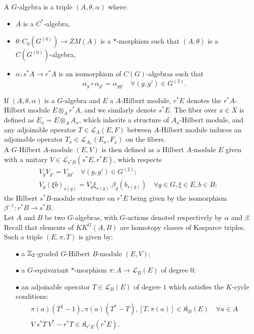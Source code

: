 A $G$-algebra is a triple $(A,\theta,\alpha) $ where:
\begin{itemize}
\item $A$ is a $C^*$-algebra, 
\item $\theta : C_0(G^{(0)})\rightarrow Z M(A)$ is a $*$-morphism such that $(A,\theta)$ is a $C(G^{(0)})$-algebra,  
\item $\alpha : s^*A \rightarrow r^* A$ is an isomorphism of $C(G)$-algebras such that 
\[ \alpha_{g}\circ \alpha_{g'} =\alpha_{gg'} \quad \forall (g,g')\in G^{(2)}.\]
\end{itemize}

If $(A,\theta,\alpha)$ is a $G$-algebra and $E$ a $A$-Hilbert module, $r^*E$ denotes the $r^*A$- Hilbert module $E\otimes_A r^*A$, and we similarly denote $s^*E$. The fiber over $x\in X$ is defined as $E_x = E\otimes_{A} A_x$, which inherits a structure of $A_x$-Hilbert module, and any adjoinable operator $T\in \mathcal L_A(E,F)$ between $A$-Hilbert module induces an adjoinable operator $T_x \in \mathcal L_{A_x}(E_x,F_x)$ on the fibers. \\

A $G$-Hilbert $A$-module $(E,V)$ is then defined as a Hilbert $A$-module $E$ given with a unitary $V\in \mathcal L_{s^* B}(s^* E , r^* E)$, which respects 
\begin{gather*} 
V_g V_{g'} = V_{gg'} \quad \forall (g,g')\in G^{(2)}; \\
V_g(\xi b)_{s(g)} = V_g\xi_{s(g)} . \beta_g(b_{s(g)}) \quad \forall g\in G,\xi \in E, b\in B;  
\end{gather*}
the Hilbert $s^*B$-module structure on $r^* E$ being given by the isomorphism $\beta^{-1} : r^* B \rightarrow s^* B$.\\ 

Let $A$ and $B$ be two $G$-algebras, with $G$-actions denoted respectively by $\alpha$ and $\beta$. Recall that elements of $KK^G(A,B)$ are homotopy classes of Kasparov triples. Such a triple $(E,\pi,T)$ is given by:
\begin{itemize}
\item[$\bullet$] a $\mathbb Z_2$-graded $G$-Hilbert $B$-module $(E,V)$; 
\item[$\bullet$] a $G$-equivariant $*$-morphism $\pi : A \rightarrow \mathcal L_B(E) $ of degree $0$;
\item[$\bullet$] an adjoinable operator $T\in \mathcal L_B(E)$ of degree $1$ which satisfies the $K$-cycle conditions:
\begin{gather*}
\pi(a)(T^2-1) , \pi(a)(T^*-T), [T, \pi(a)] \in \mathfrak K_B(E) \quad \forall a\in A \\
V\ s^* T \ V^*- r^* T \in \mathfrak K_{r^* E}(r^* E ).
\end{gather*}
\end{itemize} 

